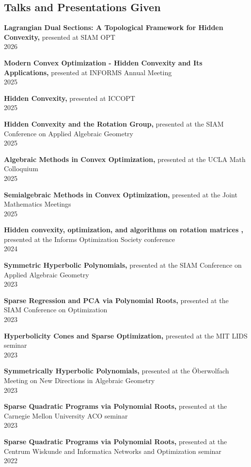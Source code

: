 \documentclass[margin]{res}
\begin{document}
\begin{resume}
\section{Talks and Presentations Given}
{\bf  Lagrangian Dual Sections: A Topological Framework for Hidden Convexity,} presented at SIAM OPT \\ 2026

{\bf  Modern Convex Optimization - Hidden Convexity and Its Applications,} presented at INFORMS Annual Meeting \\ 2025

{\bf  Hidden Convexity,} presented at ICCOPT \\ 2025

{\bf  Hidden Convexity and the Rotation Group,} presented at the SIAM Conference on Applied Algebraic Geometry \\ 2025

{\bf  Algebraic Methods in Convex Optimization,} presented at the UCLA Math Colloquium \\ 2025

{\bf  Semialgebraic Methods in Convex Optimization,} presented at the Joint Mathematics Meetings \\ 2025 

{\bf  Hidden convexity, optimization, and algorithms on rotation matrices  ,} presented at the Informs Optimization Society conference \\ 2024 

{\bf  Symmetric Hyperbolic Polynomials,} presented at the SIAM Conference on Applied Algebraic Geometry \\ 2023 

{\bf  Sparse Regression and PCA via Polynomial Roots,} presented at the SIAM Conference on Optimization \\ 2023 

{\bf  Hyperbolicity Cones and Sparse Optimization,} presented at the MIT LIDS seminar \\ 2023 

{\bf  Symmetrically Hyperbolic Polynomials,} presented at the \"Oberwolfach Meeting on New Directions in Algebraic Geometry \\ 2023 

{\bf  Sparse Quadratic Programs via Polynomial Roots,} presented at the Carnegie Mellon University ACO seminar \\ 2023 

{\bf  Sparse Quadratic Programs via Polynomial Roots,} presented at the Centrum Wiskunde and Informatica Networks and Optimization seminar \\ 2022 


\end{resume}
\end{document}
